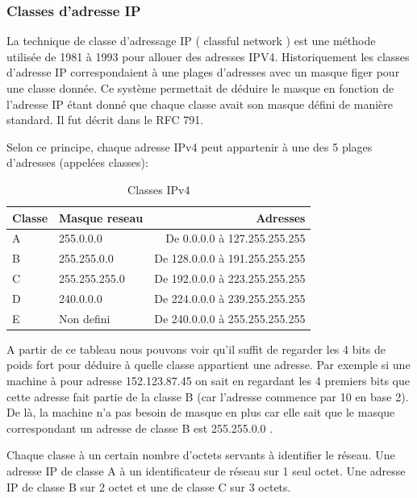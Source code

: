 \subsubsection{Classes d'adresse IP}
La technique de classe d'adressage IP ( classful network ) est une méthode
utilisée de 1981 à 1993 pour allouer des adresses IPV4.
Historiquement les classes d'adresse IP correspondaient à une plages d'adresses avec un masque figer pour une classe donnée.
Ce système permettait de déduire le masque en fonction
de l'adresse IP étant donné que chaque classe avait son masque défini de manière standard.
Il fut décrit dans le RFC 791\cite{url-RFC-791}.

Selon ce principe, chaque adresse IPv4 peut appartenir à une des 5 plages
d'adresses (appelées classes):

\begin{table}[h]
  \centering
  \begin{tabular}{| p{5cm} | p{5cm} | r |}
    \hline
    \textbf{Classe} & \textbf{Masque reseau} & \textbf{Adresses}\\
    \hline
    A & 255.0.0.0 & De 0.0.0.0 à 127.255.255.255\\
    \hline
    B & 255.255.0.0 & De 128.0.0.0 à 191.255.255.255\\
    \hline
    C & 255.255.255.0 & De 192.0.0.0 à 223.255.255.255\\
    \hline
    D & 240.0.0.0 & De 224.0.0.0 à 239.255.255.255\\
    \hline
    E & Non defini & De 240.0.0.0 à 255.255.255.255\\
    \hline
  \end{tabular}
  \caption{Classes IPv4}
  \label{tab:classes}
\end{table}

A partir de ce tableau nous pouvons voir qu'il suffit de regarder les 4 bits de
poids fort pour déduire à quelle classe appartient une adresse.  Par exemple si
une machine à pour adresse 152.123.87.45 on sait en regardant les 4 premiers
bits que cette adresse fait partie de la classe B (car l'adresse commence par
10 en base 2). De là, la machine n'a pas besoin de masque en plus car elle sait que le
masque correspondant un adresse de classe B est 255.255.0.0 .

Chaque classe à un certain nombre d'octets servants à identifier le réseau. Une
adresse IP de classe A à un identificateur de réseau sur 1 seul octet. Une
adresse IP de classe B sur 2 octet et une de classe C sur 3 octets.

